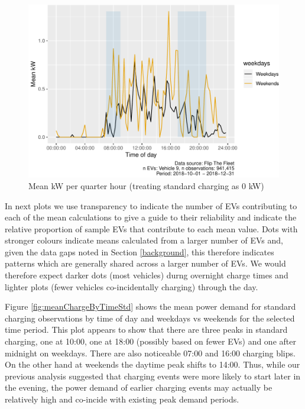 \documentclass[]{article}
\begin{document}
\begin{figure}
\centering
\includegraphics{EVBB_report_v1_files/figure-latex/rapidPowerPlotDT-1.pdf}
\caption{\label{fig:rapidPowerPlotDT}Mean kW per quarter hour (treating standard charging as 0 kW)}
\end{figure}

In next plots we use transparency to indicate the number of EVs contributing to each of the mean calculations to give a guide to their reliability and indicate the relative proportion of sample EVs that contribute to each mean value. Dots with stronger colours indicate means calculated from a larger number of EVs and, given the data gaps noted in Section \ref{background}, this therefore indicates patterns which are generally shared across a larger number of EVs. We would therefore expect darker dots (most vehicles) durng overnight charge times and lighter plots (fewer vehicles co-incidentally charging) through the day.

Figure \ref{fig:meanChargeByTimeStd} shows the mean power demand for standard charging observations by time of day and weekdays vs weekends for the selected time period. This plot appears to show that there are three peaks in standard charging, one at 10:00, one at 18:00 (possibly based on fewer EVs) and one after midnight on weekdays. There are also noticeable 07:00 and 16:00 charging blips. On the other hand at weekends the daytime peak shifts to 14:00. Thus, while our previous analysis suggested that charging events were more likely to start later in the evening, the power demand of earlier charging events may actually be relatively high and co-incide with existing peak demand periods.
\end{document}

